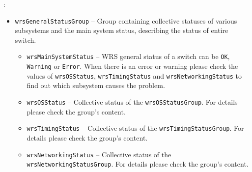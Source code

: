 :
\begin{itemize}%
  \item \texttt{wrsGeneralStatusGroup} -- Group containing collective statuses
    of various subsystems and the main system status, describing the status of
    entire switch.
    \begin{itemize}
      \item \texttt{wrsMainSystemStatus} -- WRS general status of a switch can
        be \texttt{OK}, \texttt{Warning} or \texttt{Error}. When there is an
        error or warning please check the values of \texttt{wrsOSStatus},
        \texttt{wrsTimingStatus} and \texttt{wrsNetworkingStatus} to find out
        which subsystem causes the problem.
      \item \texttt{wrsOSStatus} -- Collective status of the
        \texttt{wrsOSStatusGroup}. For details please check the group's content.
      \item \texttt{wrsTimingStatus} -- Collective status of the
	\texttt{wrsTimingStatusGroup}. For details please check the group's
        content.
      \item \texttt{wrsNetworkingStatus} -- Collective status of the
	\texttt{wrsNetworkingStatusGroup}. For details please check the group's
	content.
    \end{itemize}


\end{itemize}

